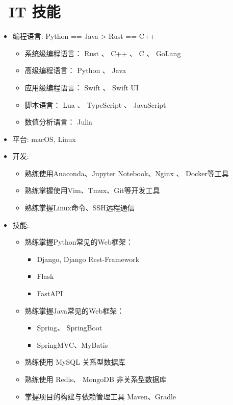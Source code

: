 \documentclass{resume}
\begin{document}
\section{\faCogs\ IT 技能}
\begin{itemize}[label=$\bullet$, parsep=0.5ex]
  \item 编程语言: Python == Java > Rust == C++
  \begin{itemize}[leftmargin=*, itemsep=5pt]
      \item 系统级编程语言： Rust 、 C++ 、 C 、 GoLang
      \item 高级编程语言： Python 、 Java 
      \item 应用级编程语言： Swift 、 Swift UI
      \item 脚本语言： Lua 、 TypeScript 、 JavaScript
      \item 数值分析语言： Julia
  \end{itemize}
  \item 平台: macOS, Linux
  \item 开发: 
  \begin{itemize}
      \item 熟练使用Anaconda、Jupyter Notebook、Nginx 、 Docker等工具
      \item 熟练掌握使用Vim、Tmux、Git等开发工具
      \item 熟练掌握Linux命令、SSH远程通信
  \end{itemize}
  \item 技能: 
      \begin{itemize}
      \item 熟练掌握Python常见的Web框架：
        \begin{itemize}
      \item Django, Django Rest-Framework
      \item Flask
      \item FastAPI
  \end{itemize}
      \item 熟练掌握Java常见的Web框架：
        \begin{itemize}
            \item Spring、 SpringBoot
            \item SpringMVC、MyBatis
        \end{itemize}
      \item 熟练使用 MySQL 关系型数据库
      \item 熟练使用 Redis、 MongoDB 非关系型数据库
      \item 掌握项目的构建与依赖管理工具 Maven、Gradle

\end{itemize}
\end{itemize}
\end{document}
